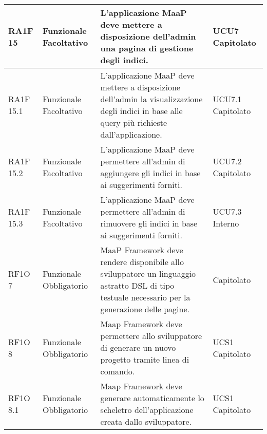 \begin{center}
\begin{longtable}{ | l | p{2cm} | p{5cm} | p{1.7cm} |}
        RA1F 15 & Funzionale \newline  Facoltativo  & L'applicazione MaaP deve mettere a disposizione dell'admin una pagina di gestione degli indici. &  UCU7 \newline  Capitolato \newline  \\ \hline      
        RA1F 15.1 & Funzionale \newline  Facoltativo  & L'applicazione MaaP deve mettere a disposizione dell'admin la visualizzazione degli indici in base alle query più richieste dall'applicazione. &  UCU7.1 \newline  Capitolato \newline  \\ \hline      
        RA1F 15.2 & Funzionale \newline  Facoltativo  & L'applicazione MaaP deve permettere all'admin di aggiungere gli indici in base ai suggerimenti forniti. &  UCU7.2 \newline  Capitolato \newline  \\ \hline      
        RA1F 15.3 & Funzionale \newline  Facoltativo  & L'applicazione MaaP deve permettere all'admin di rimuovere gli indici in base ai suggerimenti forniti. &  UCU7.3 \newline  Interno \newline  \\ \hline      
        RF1O 7 & Funzionale \newline  Obbligatorio  & MaaP Framework deve rendere disponibile allo sviluppatore un linguaggio astratto DSL di tipo testuale necessario per la generazione delle pagine. &  Capitolato \newline  \\ \hline      
        RF1O 8  & Funzionale \newline  Obbligatorio  & Maap Framework deve permettere allo sviluppatore di generare un nuovo progetto tramite linea di comando.
 &  UCS1 \newline  Capitolato \newline  \\ \hline      
        RF1O 8.1  & Funzionale \newline  Obbligatorio  & Maap Framework deve generare automaticamente lo scheletro dell'applicazione creata dallo sviluppatore.
 &  UCS1 \newline  Capitolato \newline  \\ \hline      

\end{longtable}
\end{center}

